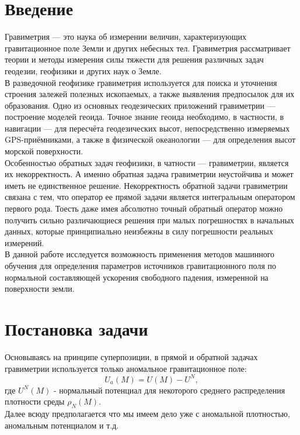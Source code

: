 \documentclass[12pt]{article}
\begin{document}
\section
{Введение}
Гравиметрия — это нау­ка об из­ме­ре­нии ве­ли­чин, ха­рак­те­ри­зую­щих гравитационное по­ле Земли и других небесных тел. Гравиметрия рассматривает теории и методы измерения силы тяжести для решения различных задач геодезии, геофизики и других наук о Земле.\\
\newline
В разведочной геофизике гравиметрия используется для поиска и уточнения строения залежей полезных ископаемых, а также выявления предпосылок для их образования. Одно из основных геодезических приложений гравиметрии — построение моделей геоида. Точное знание геоида необходимо, в частности, в навигации — для пересчёта геодезических высот, непосредственно измеряемых GPS-приёмниками,
 а также в физической океанологии — для определения высот морской поверхности.\\
\newline
Особенностью обратных задач геофизики, в чатности — гравиметрии, является их некорректность. А именно обратная задача гравиметрии неустойчива и может иметь не единственное решение.
Некорректность обратной задачи гравиметрии связана с тем, что оператор ее прямой задачи является интегральным оператором первого рода.
Тоесть даже имея абсолютно точный обратный оператор можно получить сильно различающиеся решения при малых погрешностях в начальных данных, которые принципиально неизбежны в силу погрешности реальных измерений.\\
\newline
В данной работе исследуется возможность применения методов машинного обучения для определения параметров источников гравитационного поля по нормальной составляющей ускорения свободного падения, измеренной на поверхности земли.
\clearpage

\section
{Постановка задачи}

Основываясь на принципе суперпозиции, в прямой и обратной задачах гравиметрии используется только аномальное гравитационное поле:
\[U_a(M)=U(M)-U^N,\] где $U^N(M)$ - нормальный потенциал для некоторого среднего распределения плотности среды $\rho_N(M)$.\\
Далее всюду предполагается что мы имеем дело уже с аномальной плотностью, аномальным потенциалом и т.д.
\end{document}

